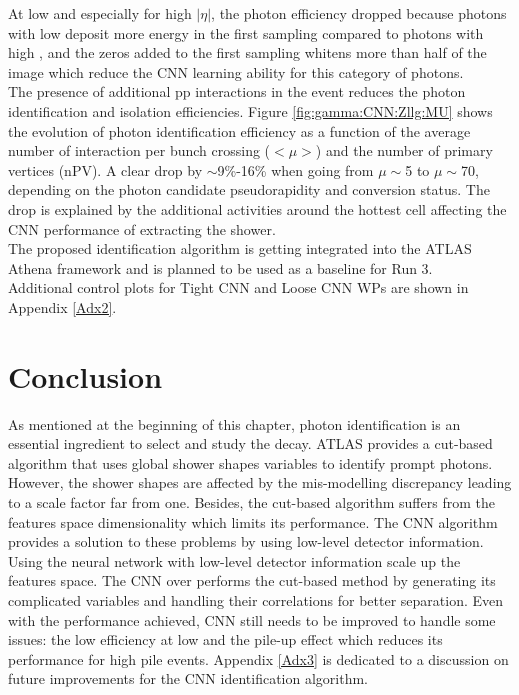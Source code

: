 At low \eT and especially for high $|\eta|$, the photon efficiency dropped because photons with low \eT deposit more energy in the first sampling compared to photons with high \eT, and the zeros added to the first sampling whitens more than half of the image which reduce the CNN learning ability for this category of photons. \\
The presence of additional pp interactions in the event reduces the photon identification and isolation efficiencies. Figure \ref{fig:gamma:CNN:Zllg:MU} shows the evolution of photon identification efficiency as a function of the average number of interaction per bunch crossing ($<\mu>$) and the number of primary vertices (nPV). A clear drop by $\sim$9\%-16\% when going from $\mu\sim$5 to $\mu\sim$70, depending on the photon candidate pseudorapidity and conversion status. The drop is explained by the additional activities around the hottest cell affecting the CNN performance of extracting the shower. \\
The proposed identification algorithm is getting integrated into the ATLAS Athena framework and is planned to be used as a baseline for Run 3. \\
Additional control plots for Tight CNN and Loose CNN WPs are shown in Appendix \ref{Adx2}.

\section{Conclusion}
\label{gamma:conc}

As mentioned at the beginning of this chapter, photon identification is an essential ingredient to select and study the \HHyybb decay. ATLAS provides a cut-based algorithm that uses global shower shapes variables to identify prompt photons. However, the shower shapes are affected by the mis-modelling discrepancy leading to a scale factor far from one. Besides, the cut-based algorithm suffers from the features space dimensionality which limits its performance. The CNN algorithm provides a solution to these problems by using low-level detector information. Using the neural network with low-level detector information scale up the features space. The CNN over performs the cut-based method by generating its complicated variables and handling their correlations for better separation. Even with the performance achieved, CNN still needs to be improved to handle some issues: the low efficiency at low \eT and the pile-up effect which reduces its performance for high pile events. Appendix \ref{Adx3} is dedicated to a discussion on future improvements for the CNN identification algorithm. 
